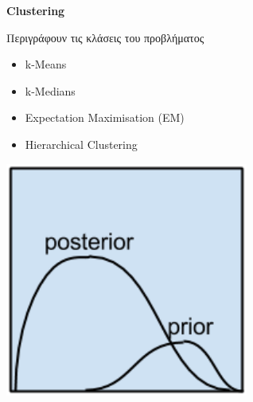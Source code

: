 \begin{minipage}{0.5\textwidth}

  \textbf{\large Clustering}

  Περιγράφουν τις κλάσεις του προβλήματος %
  \begin{itemize}
    \setlength\itemsep{0em}
    \item{k-Means}
    \item{k-Medians}
    \item{Expectation Maximisation (EM)}
    \item{Hierarchical Clustering}
  \end{itemize}
\end{minipage}
\begin{minipage}{0.5\textwidth}
  \begin{center}
    \includegraphics[width=0.6\textwidth]{./images/chapter3/bayesian_algorithms.png}
  \end{center}
\end{minipage}

